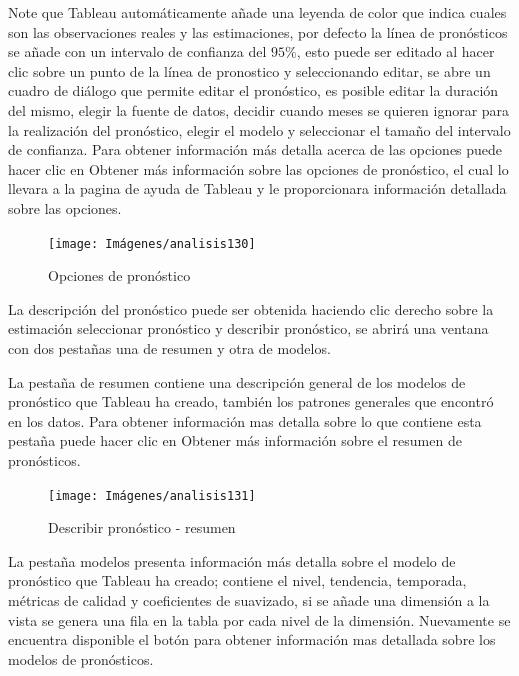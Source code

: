 \documentclass[
]{book}
\begin{document}
Note que Tableau automáticamente añade una leyenda de color que indica cuales son las observaciones reales y las estimaciones, por defecto la línea de pronósticos se añade con un intervalo de confianza del \(95\%\), esto puede ser editado al hacer clic sobre un punto de la línea de pronostico y seleccionando editar, se abre un cuadro de diálogo que permite editar el pronóstico, es posible editar la duración del mismo, elegir la fuente de datos, decidir cuando meses se quieren ignorar para la realización del pronóstico, elegir el modelo y seleccionar el tamaño del intervalo de confianza. Para obtener información más detalla acerca de las opciones puede hacer clic en Obtener más información sobre las opciones de pronóstico, el cual lo llevara a la pagina de ayuda de Tableau y le proporcionara información detallada sobre las opciones.

\begin{figure}

{\centering \texttt{[image: Imágenes/analisis130]} 

}

\caption{Opciones de pronóstico}\label{fig:opcionespronosticos-fig}
\end{figure}

La descripción del pronóstico puede ser obtenida haciendo clic derecho sobre la estimación seleccionar pronóstico y describir pronóstico, se abrirá una ventana con dos pestañas una de resumen y otra de modelos.

La pestaña de resumen contiene una descripción general de los modelos de pronóstico que Tableau ha creado, también los patrones generales que encontró en los datos. Para obtener información mas detalla sobre lo que contiene esta pestaña puede hacer clic en Obtener más información sobre el resumen de pronósticos.

\begin{figure}

{\centering \texttt{[image: Imágenes/analisis131]} 

}

\caption{Describir pronóstico - resumen}\label{fig:resumenpronosticos-fig}
\end{figure}

La pestaña modelos presenta información más detalla sobre el modelo de pronóstico que Tableau ha creado; contiene el nivel, tendencia, temporada, métricas de calidad y coeficientes de suavizado, si se añade una dimensión a la vista se genera una fila en la tabla por cada nivel de la dimensión. Nuevamente se encuentra disponible el botón para obtener información mas detallada sobre los modelos de pronósticos.
\end{document}
